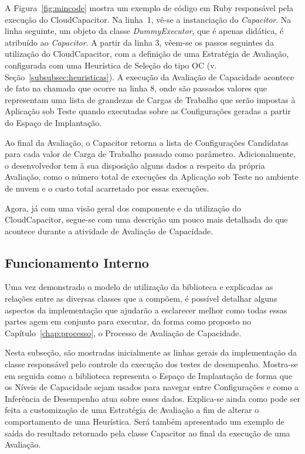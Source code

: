 A Figura~\ref{fig:mincode} mostra um exemplo de código em Ruby responsável pela execução do CloudCapacitor. Na linha~1, vê-se a instanciação do \emph{Capacitor}. Na 
linha seguinte, um objeto da classe \emph{DummyExecutor}, que é apenas didática, 
é atribuído ao \emph{Capacitor}. A partir da linha 3, vêem-se os passos seguintes da utilização do 
CloudCapacitor, com a definição de uma Estratégia de Avaliação, configurada
com uma Heurística de Seleção do tipo OC (v. Seção~\ref{subsubsec:heuristicas}).
A execução da Avaliação de Capacidade acontece de fato na chamada que ocorre
na linha 8, onde são passados valores que representam uma lista de grandezas de
Cargas de Trabalho que serão impostas à Aplicação sob Teste quando executadas sobre as
Configurações geradas a partir do Espaço de Implantação.

Ao final da Avaliação, o Capacitor retorna a lista de Configurações Candidatas
para cada valor de Carga de Trabalho passado como parâmetro. Adicionalmente, o
desenvolvedor tem à sua disposição alguns dados a respeito da própria Avaliação,
como o número total de execuções da Aplicação sob Teste no ambiente de nuvem e o  
custo total acarretado por essas execuções. 

Agora, já com uma visão geral dos componente e da utilização do CloudCapacitor,
segue-se com uma descrição um pouco mais detalhada do que acontece durante a atividade
de Avaliação de Capacidade.

\subsection{Funcionamento Interno}
\label{subsec:capacitor_funcionamento}
Uma vez demonstrado o modelo de utilização da biblioteca e explicadas as relações
entre as diversas classes que a compõem, é possível detalhar alguns aspectos da
implementação que ajudarão a esclarecer melhor como todas essas partes agem em
conjunto para executar, da forma como proposto no Capítulo~\ref{chap:processo},
o Processo de Avaliação de Capacidade.

Nesta subseção, são mostradas inicialmente as linhas gerais da implementação da classe 
responsável pelo controle da execução dos testes de desempenho. Mostra-se em 
seguida como a biblioteca representa o Espaço de Implantação de forma que os 
Níveis de Capacidade sejam usados para navegar entre Configurações e como a 
Inferência de Desempenho atua sobre esses dados. Explica-se ainda como pode ser 
feita a customização de uma Estratégia de Avaliação a fim de alterar o 
comportamento de uma Heurística. Será também apresentado um exemplo de saída do 
resultado retornado pela classe Capacitor ao final da execução de uma Avaliação.

